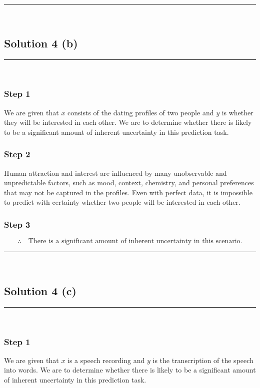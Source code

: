 \documentclass{article}
\begin{document}
\noindent\rule{\textwidth}{0.4pt}\\

\newpage

\subsection*{Solution 4 (b)}
\noindent\rule{\textwidth}{0.4pt}\\

\subsubsection*{Step 1}
\parbox{\textwidth}{
We are given that $x$ consists of the dating profiles of two people and $y$ is whether they will be interested in each other. We are to determine whether there is likely to be a significant amount of inherent uncertainty in this prediction task.
}

\subsubsection*{Step 2}
\parbox{\textwidth}{
Human attraction and interest are influenced by many unobservable and unpredictable factors, such as mood, context, chemistry, and personal preferences that may not be captured in the profiles. Even with perfect data, it is impossible to predict with certainty whether two people will be interested in each other.
}

\subsubsection*{Step 3}
\parbox{\textwidth}{
\[
\therefore \quad \text{There is a significant amount of inherent uncertainty in this scenario.}
\]
}

\noindent\rule{\textwidth}{0.4pt}\\

\newpage

\subsection*{Solution 4 (c)}
\noindent\rule{\textwidth}{0.4pt}\\

\subsubsection*{Step 1}
\parbox{\textwidth}{
We are given that $x$ is a speech recording and $y$ is the transcription of the speech into words. We are to determine whether there is likely to be a significant amount of inherent uncertainty in this prediction task.
}
\end{document}
